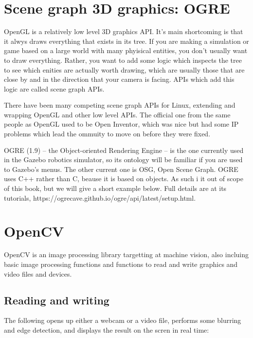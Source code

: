 \documentclass[oneside,english]{scrbook}
\begin{document}
\chapter{Scene graph 3D graphics: OGRE}

OpenGL is a relatively low level 3D graphics API.  It's main shortcoming is that it alwys draws everything that exists in its tree.  If you are making a simulation or game based on a large world with many phyisical entities, you don't usually want to draw everything. Rather, you want to add some logic which inspects the tree to see which enities are actually worth drawing, which are usually those that are close by and in the direction that your camera is facing.    APIs which add this logic are called scene graph APIs.    

There have been many competing scene graph APIs for Linux, extending and wrapping OpenGL and other low level APIs.  The official one from the same people as OpenGL used to be Open Inventor, which was nice but had some IP problems which lead the ommuity to move on before they were fixed.

OGRE (1.9) -- the Object-oriented Rendering Engine -- is the one currently used in the Gazebo robotics simulator, so its ontology will be familiar if you are used to Gazebo's menus.   The other current one is OSG, Open Scene Graph.  OGRE uses C++ rather than C, beause it is based on objects.  As such i it out of scope of this book, but we will give a short example below.  Full details are at its tutorials, https://ogrecave.github.io/ogre/api/latest/setup.html.





\chapter{OpenCV}

OpenCV is an image processing library targetting at machine vision, also incluing basic image processing functions and functions to read and write graphics and video files and devices.

\section{Reading and writing}

The following opens up either a webcam or a video file, performs some blurring and edge detection, and displays the result on the scren in real time:
\end{document}
